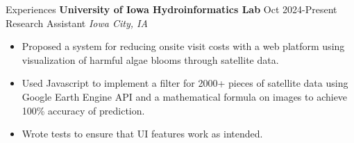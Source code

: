 \documentclass{resume} %
\begin{document}
%
\begin{rSection}{Experiences}
\textbf{University of Iowa Hydroinformatics Lab} \hfill Oct 2024-Present\\
Research Assistant \hfill \textit{Iowa City, IA}
 \begin{itemize}
  \itemsep -3pt {} 
  \item Proposed a system for reducing onsite visit costs with a web platform using visualization of harmful algae blooms through satellite data.
  \item Used Javascript to implement a filter for 2000+ pieces of satellite data using Google Earth Engine API and a mathematical formula on images to achieve 100\% accuracy of prediction.
  \item Wrote tests to ensure that UI features work as intended.
  \end{itemize}

\end{rSection} 

\end{document}
